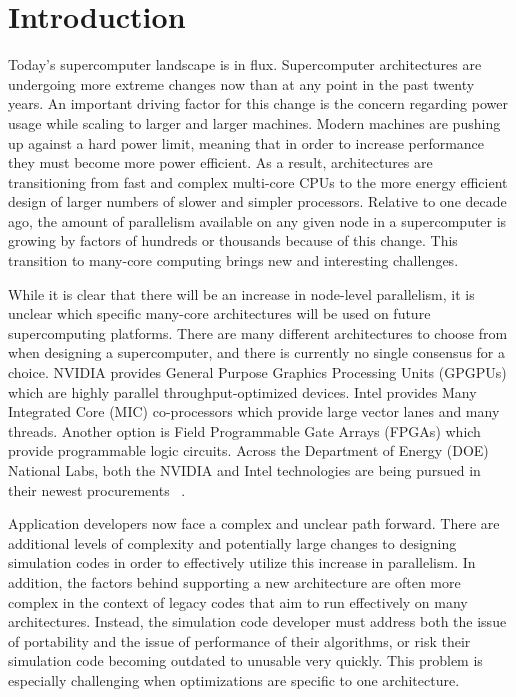 \section{ \textbf{Introduction}}

Today's supercomputer landscape is in flux.
%
Supercomputer architectures are undergoing more extreme changes now than at any point in the past twenty years.
%
An important driving factor for this change is the concern regarding power usage while scaling to larger and larger machines.
%
Modern machines are pushing up against a hard power limit, meaning that in order to increase performance they must become more power efficient.
%
As a result, architectures are transitioning from fast and complex multi-core CPUs to the more energy efficient design of larger numbers of slower and simpler processors.
%
Relative to one decade ago, the amount of parallelism available on any given node in a supercomputer is growing by factors of hundreds or thousands because of this change.
%
This transition to many-core computing brings new and interesting challenges.
%

%
While it is clear that there will be an increase in node-level parallelism, it is unclear which specific many-core architectures will be used on future supercomputing platforms.
%
There are many different architectures to choose from when designing a supercomputer, and there is currently no single consensus for a choice.
%
NVIDIA provides General Purpose Graphics Processing Units (GPGPUs) which are highly parallel throughput-optimized devices.
%
Intel provides Many Integrated Core (MIC) co-processors which provide large vector lanes and many threads.
%
Another option is Field Programmable Gate Arrays (FPGAs) which provide programmable logic circuits.
%
Across the Department of Energy (DOE) National Labs, both the NVIDIA and Intel technologies are being pursued in their newest procurements ~\cite{coralWeb, trinityWeb}.
%

Application developers now face a complex and unclear path forward.
%
There are additional levels of complexity and potentially large changes to designing simulation codes in order to effectively utilize this increase in parallelism.
%
In addition, the factors behind supporting a new architecture are often more complex in the context of legacy codes that aim to run effectively on many architectures.
%
Instead, the simulation code developer must address both the issue of portability and the issue of performance of their algorithms, or risk their simulation code becoming outdated to unusable very quickly.
%
This problem is especially challenging when optimizations are specific to one architecture.
%

